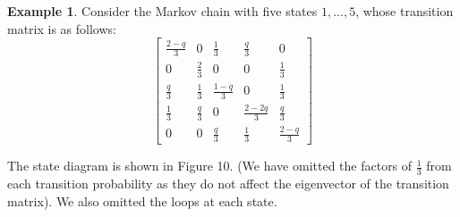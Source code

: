 \documentclass[11pt]{amsart}
\theoremstyle{definition}
\newtheorem{example}[theorem]{Example}
\theoremstyle{remark}
\begin{document}
\begin{example}\label{ex:2}
Consider the Markov chain with five states $1,\dots,5$,
whose transition matrix is as follows:
\begin{equation}
\begin{bmatrix}
	\frac{2-q}{3} & 0 & \frac{1}{3} & \frac{q}{3} & 0\\
	0 & \frac{2}{3} & 0 & 0 & \frac{1}{3}\\
	\frac{q}{3} & \frac{1}{3} & \frac{1-q}{3} & 0 & \frac{1}{3}\\
	\frac{1}{3} & \frac{q}{3} & 0 & \frac{2-2q}{3} & \frac{q}{3} \\
	0 & 0 & \frac{q}{3} & \frac{1}{3} & \frac{2-q}{3}
\end{bmatrix}
\end{equation}

	The state diagram  is shown in Figure 10.
	(We have omitted the factors of $\frac{1}{3}$
	from each 
	transition probability %
	as they do not affect
	the eigenvector of the transition matrix).  
	We also omitted the loops 
	at each state.


\end{example}
\end{document}
